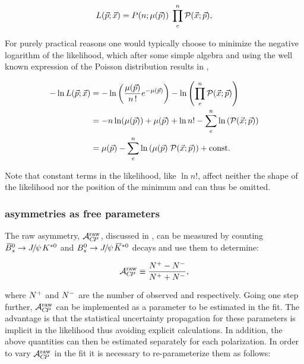 \begin{equation}
  \centering
L(\vec{p};\vec{x}) = P(n;\expEvnts) \; \prod_e^n \mathcal{P}(\vec{x};\vec{p}),
\label{extlikelihood}
\end{equation}

For purely practical reasons one would typically choose to minimize the negative logarithm of the likelihood, which after some simple
algebra and using the well known expression of the Poisson distribution results in ,

\begin{align}
  \centering
  -\nll &= -\ln\left( \frac{\expEvnts}{n\,!} e^{-\expEvnts } \right) - \ln\left( \prod_e^n \mathcal{P}(\vec{x};\vec{p}) \right)  \nonumber \\
        &= - n\ln(\expEvnts) + \expEvnts  + \ln n! - \sum_e^n \ln\parenthesis{\mathcal{P}(\vec{x};\vec{p})} \nonumber \\
        &=  \expEvnts  - \sum_e^n \ln\parenthesis{\expEvnts \; \mathcal{P}(\vec{x};\vec{p}) } + {\rm const}.
\label{extloglikelihood}
\end{align}

\noindent Note that constant terms in the likelihood, like $\ln n!$, affect neither the shape of the likelihood
nor the position of the minimum and can thus be omitted.

\subsubsection{\CP asymmetries as free parameters}
\label{cp_assymetries_and_total_decay_rate}
The raw asymmetry, $\mathcal{A}_{C\!P}^{\rm raw}$, discussed in , can be measured by counting
$\BsbarJpsiKst$ and $\BsJpsiKst$ decays and use them to determine:

\begin{equation}
\mathcal{A}_{C\!P}^{\text{raw}} \equiv \frac{{N^+} - {N^-}}{{N^+} + {N^-}},
\label{acp_mes}
\end{equation}

\noindent where ${N^+}$ and ${N^-}$ are the number of observed \BsbarJpsiKst and \BsJpsiKst respectively.
Going one step further, $\mathcal{A}_{C\!P}^{\text{raw}}$ can be implemented as a parameter to be estimated in the fit. The advantage
is that the statistical uncertainty propagation for these parameters is implicit in the likelihood thus avoiding
explicit calculations. In addition, the above quantities can then be estimated separately for each polarization.
In order to vary $\mathcal{A}_{C\!P}^{\text{raw}}$ in the fit it is necessary to re-parameterize them as follows:

